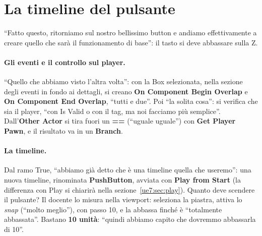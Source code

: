 \section{La timeline del pulsante}
\label{ue7:sec:timeline}

``Fatto questo, ritorniamo sul nostro bellissimo button e andiamo effettivamente a creare
quello che sarà il funzionamento di base'': il tasto si deve abbassare sulla Z.

\paragraph{Gli eventi e il controllo sul player.} ``Quello che abbiamo visto l'altra
volta'': con la Box selezionata, nella sezione degli eventi in fondo ai dettagli, si
creano \textbf{On Component Begin Overlap} e \textbf{On Component End Overlap}, ``tutti e
due''. Poi ``la solita cosa'': si verifica che sia il player, ``con Is Valid o con il
tag, ma noi facciamo più semplice''. Dall'\textbf{Other Actor} si tira fuori un
\textbf{==} (``uguale uguale'') con \textbf{Get Player Pawn}, e il risultato va in un
\textbf{Branch}.

\paragraph{La timeline.} Dal ramo True, ``abbiamo già detto che è una timeline quella
che useremo'': una nuova timeline, rinominata \textbf{PushButton}, avviata con
\textbf{Play from Start} (la differenza con Play si chiarirà nella
sezione~\ref{ue7:sec:play}). Quanto deve scendere il pulsante? Il docente lo misura
nella viewport: seleziona la piastra, attiva lo \emph{snap} (``molto meglio''), con passo
10, e la abbassa finché è ``totalmente abbassata''. Bastano \textbf{10 unità}: ``quindi
abbiamo capito che dovremmo abbassarla di 10''.

